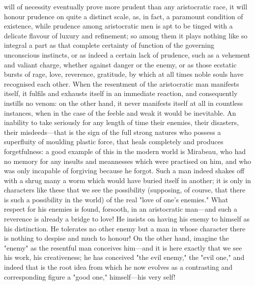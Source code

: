 \documentclass[12pt]{article}
\begin{document}
will of necessity eventually prove more prudent than any aristocratic race, it will honour prudence on quite a distinct scale, as, in fact, a paramount condition of existence, while prudence among aristocratic men is apt to be tinged with a delicate flavour of luxury and refinement; so among them it plays nothing like so integral a part as that complete certainty of function of the governing unconscious instincts, or as indeed a certain lack of prudence, such as a vehement and valiant charge, whether against danger or the enemy, or as those ecstatic bursts of rage, love, reverence, gratitude, by which at all times noble souls have recognised each other. When the resentment of the aristocratic man manifests itself, it fulfils and exhausts itself in an immediate reaction, and consequently instills no venom: on the other hand, it never manifests itself at all in countless instances, when in the case of the feeble and weak it would be inevitable. An inability to take seriously for any length of time their enemies, their disasters, their misdeeds---that is the sign of the full strong natures who possess a superfluity of moulding plastic force, that heals completely and produces forgetfulness: a good example of this in the modern world is Mirabeau, who had no memory for any insults and meannesses which were practised on him, and who was only incapable of forgiving because he forgot. Such a man indeed shakes off with a shrug many a worm which would have buried itself in another; it is only in characters like these that we see the possibility (supposing, of course, that there is such a possibility in the world) of the real "love of one's enemies." What respect for his enemies is found, forsooth, in an aristocratic man---and such a reverence is already a bridge to love! He insists on having his enemy to himself as his distinction. He tolerates no other enemy but a man in whose character there is nothing to despise and much to honour! On the other hand, imagine the "enemy" as the resentful man conceives him---and it is here exactly that we see his work, his creativeness; he has conceived "the evil enemy," the "evil one," and indeed that is the root idea from which he now evolves as a contrasting and corresponding figure a "good one," himself---his very self!
\end{document}
